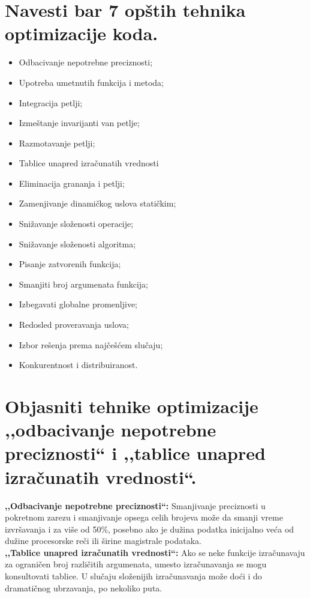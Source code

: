 \documentclass[a4paper]{article}
\begin{document}
\section{Navesti bar 7 opštih tehnika optimizacije koda.}
  \begin{itemize}
    \item Odbacivanje nepotrebne preciznosti;
    \item Upotreba umetnutih funkcija i metoda;
    \item Integracija petlji;
    \item Izmeštanje invarijanti van petlje;
    \item Razmotavanje petlji;
    \item Tablice unapred izračunatih vrednosti
    \item Eliminacija grananja i petlji;
    \item Zamenjivanje dinamičkog uslova statičkim;
    \item Snižavanje složenosti operacije;
    \item Snižavanje složenosti algoritma;
    \item Pisanje zatvorenih funkcija;
    \item Smanjiti broj argumenata funkcija;
    \item Izbegavati globalne promenljive;
    \item Redosled proveravanja uslova;
    \item Izbor rešenja prema najčešćem slučaju;
    \item Konkurentnost i distribuiranost.
  \end{itemize}

\section{Objasniti tehnike optimizacije ,,odbacivanje nepotrebne preciznosti`` i 
         ,,tablice unapred izračunatih vrednosti``.}
  \textbf{,,Odbacivanje nepotrebne preciznosti``:} Smanjivanje preciznosti u pokretnom zarezu i 
  smanjivanje opsega celih brojeva može da smanji vreme izvršavanja i za više od 50\%, 
  posebno ako je dužina podatka inicijalno veća od dužine 
  procesorske reči ili širine magistrale podataka.\\
  \indent \textbf{,,Tablice unapred izračunatih vrednosti``:} Ako se neke funkcije izračunavaju za 
  ograničen broj različitih argumenata, umesto izračunavanja se mogu konsultovati tablice. U slučaju 
  složenijih izračunavanja može doći i do dramatičnog ubrzavanja, po nekoliko puta.
\end{document}
